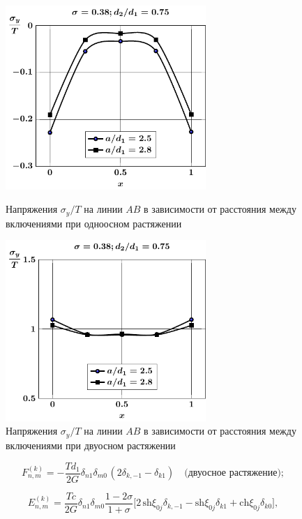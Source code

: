 \begin{russian}
\begin{figure}[h!]
\centering\footnotesize
\parbox[b]{7.5cm}{\centering\includegraphics[width=7.6cm]{periodic-inc27-a-d75-g25-t1-sig_y.pdf}
\caption{Напряжения $\sigma_y/T$ на линии $AB$ в зависимости от расстояния между включениями при одноосном растяжении
\label{f:11:27}}}\hfil\hfil
\parbox[b]{7.5cm}{\centering\includegraphics[width=7.6cm]{periodic-inc27-a-d75-g25-t2-sig_y.pdf}
\caption{Напряжения $\sigma_y/T$ на линии $AB$ в зависимости от расстояния между включениями при двуосном растяжении
\label{f:11:28}}}
\end{figure}

\begin{equation*}
F_{n,m}^{(k)} =  -\frac{Td_1}{2G}{\delta _{n1}}{\delta _{m0\,}}(2{\delta _{k, - 1}} - {\delta _{k1}})\quad\text{(двуосное растяжение)};
\end{equation*}

\begin{equation*}
E_{n,m}^{(k)} =\frac{Tc}{2G}\delta_{n1}\delta_{m0}\frac{1-2\sigma}{1+\sigma}\bigg[2\,\mathrm{sh}\xi_{0j}\delta_{k,-1}-\mathrm{sh}\xi_{0j}\delta_{k1}+\mathrm{ch}\xi_{0j}\delta_{k0}\bigg],
\end{equation*}


\end{russian}
